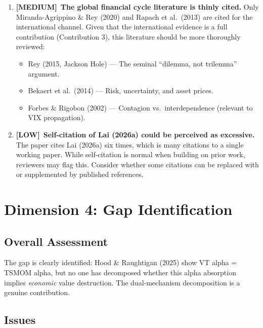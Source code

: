 \documentclass[12pt,a4paper]{article}
\newcommand{\MEDIUM}{\textcolor{medsev}{\textbf{[MEDIUM]}}}
\newcommand{\LOW}{\textcolor{lowsev}{\textbf{[LOW]}}}
\begin{document}
\begin{enumerate}[label=\textbf{3.\arabic*}]
\textbf{Recommendation:} Add these citations to strengthen the trend-following literature coverage.

\item \MEDIUM\ \textbf{The global financial cycle literature is thinly cited.}
Only Miranda-Agrippino \& Rey (2020) and Rapach et al.\ (2013) are cited for the international channel. Given that the international evidence is a full contribution (Contribution 3), this literature should be more thoroughly reviewed:
\begin{itemize}
\item Rey (2015, Jackson Hole) --- The seminal ``dilemma, not trilemma'' argument.
\item Bekaert et al.\ (2014) --- Risk, uncertainty, and asset prices.
\item Forbes \& Rigobon (2002) --- Contagion vs.\ interdependence (relevant to VIX propagation).
\end{itemize}

\item \LOW\ \textbf{Self-citation of Lai (2026a) could be perceived as excessive.}
The paper cites Lai (2026a) six times, which is many citations to a single working paper. While self-citation is normal when building on prior work, reviewers may flag this. Consider whether some citations can be replaced with or supplemented by published references.

\end{enumerate}


\section{Dimension 4: Gap Identification}

\subsection*{Overall Assessment}
The gap is clearly identified: Hood \& Raughtigan (2025) show VT alpha = TSMOM alpha, but no one has decomposed whether this alpha absorption implies \textit{economic} value destruction. The dual-mechanism decomposition is a genuine contribution.

\subsection*{Issues}
\end{document}

